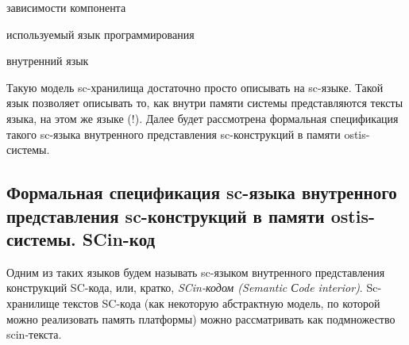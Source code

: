 \begin{SCn}
\begin{scnindent}
    \begin{scnindent}
    \end{scnindent}
\end{scnindent}
\begin{scnrelfromset}{зависимости компонента}
\end{scnrelfromset}
\begin{scnrelfromlist}{используемый язык программирования}
\end{scnrelfromlist}
\begin{scnrelfromlist}{внутренний язык}
\end{scnrelfromlist}
\end{SCn}

Такую модель sc-хранилища достаточно просто описывать на sc-языке. Такой язык позволяет описывать то, как внутри памяти системы представляются тексты языка, на этом же языке (!). Далее будет рассмотрена формальная спецификация такого sc-языка внутренного представления sc-конструкций в памяти ostis-системы.

\subsection{Формальная спецификация sc-языка внутренного представления sc-конструкций в памяти ostis-системы. SCin-код}
\label{sec_soft_platform_scin_code}

Одним из таких языков будем называть sc-языком внутренного представления конструкций SC-кода, или, кратко, \textit{SCin-кодом (Semantic Сode interior)}. Sc-хранилище текстов SC-кода (как некоторую абстрактную модель, по которой можно реализовать память платформы) можно рассматривать как подмножество scin-текста.

\begin{SCn}
\begin{scnindent}
\end{scnindent}
\end{SCn}

